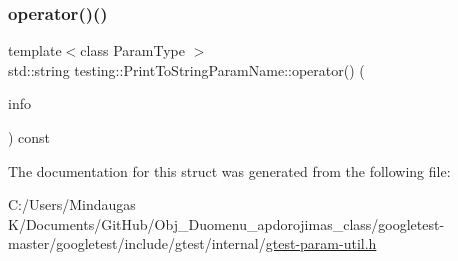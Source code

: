 \subsubsection{\texorpdfstring{operator()()}{operator()()}\hspace{0.1cm}{\footnotesize\ttfamily [3/3]}}
{\footnotesize\ttfamily template$<$class Param\+Type $>$ \\
std\+::string testing\+::\+Print\+To\+String\+Param\+Name\+::operator() (\begin{DoxyParamCaption}\item[{const \mbox{\hyperlink{structtesting_1_1_test_param_info}{Test\+Param\+Info}}$<$ Param\+Type $>$ \&}]{info }\end{DoxyParamCaption}) const\hspace{0.3cm}{\ttfamily [inline]}}



The documentation for this struct was generated from the following file\+:\begin{DoxyCompactItemize}
\item 
C\+:/\+Users/\+Mindaugas K/\+Documents/\+Git\+Hub/\+Obj\+\_\+\+Duomenu\+\_\+apdorojimas\+\_\+class/googletest-\/master/googletest/include/gtest/internal/\mbox{\hyperlink{googletest-master_2googletest_2include_2gtest_2internal_2gtest-param-util_8h}{gtest-\/param-\/util.\+h}}\end{DoxyCompactItemize}
